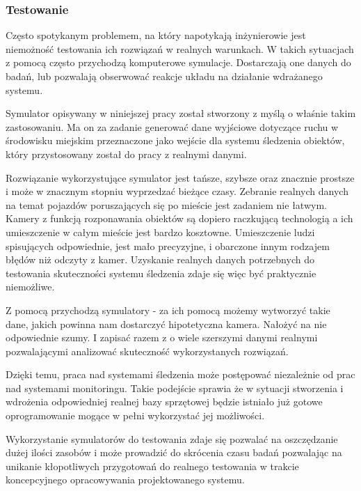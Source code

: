 \subsubsection{Testowanie}
\par{
Często spotykanym problemem, na który napotykają inżynierowie jest niemożność testowania ich rozwiązań w realnych warunkach. W takich sytuacjach z pomocą często przychodzą komputerowe symulacje. Dostarczają one danych do badań, lub pozwalają obserwować reakcje układu na działanie wdrażanego systemu.
}
\par{
Symulator opisywany w niniejszej pracy został stworzony z myślą o właśnie takim zastosowaniu. Ma on za zadanie generować dane wyjściowe dotyczące ruchu w środowisku miejskim przeznaczone jako wejście dla systemu śledzenia obiektów, który przystosowany został do pracy z realnymi danymi.
}
\par{
Rozwiązanie wykorzystujące symulator jest tańsze, szybsze oraz znacznie prostsze i może w znacznym stopniu wyprzedzać bieżące czasy.
Zebranie realnych danych na temat pojazdów poruszających się po mieście jest zadaniem nie łatwym. Kamery z funkcją rozponawania obiektów są dopiero raczkującą technologią a ich umieszczenie w całym mieście jest bardzo kosztowne. Umieszczenie ludzi spisujących odpowiednie, jest mało precyzyjne, i obarczone innym rodzajem błędów niż odczyty z kamer. Uzyskanie realnych danych potrzebnych do testowania skuteczności systemu śledzenia zdaje się więc być praktycznie niemożliwe.
}
\par{
Z pomocą przychodzą symulatory - za ich pomocą możemy wytworzyć takie dane, jakich powinna nam dostarczyć hipotetyczna kamera. Nałożyć na nie odpowiednie szumy. I zapisać razem z o wiele szerszymi danymi realnymi pozwalającymi analizować skuteczność wykorzystanych rozwiązań.
}
\par{
Dzięki temu, praca nad systemami śledzenia może postępować niezależnie od prac nad systemami monitoringu. Takie podejście sprawia że w sytuacji stworzenia i wdrożenia odpowiedniej realnej bazy sprzętowej będzie istniało już gotowe oprogramowanie mogące w pełni wykorzystać jej możliwości.
}
\par{
Wykorzystanie symulatorów do testowania zdaje się pozwalać na oszczędzanie dużej ilości zasobów i może prowadzić do skrócenia czasu badań pozwalając na unikanie kłopotliwych przygotowań do realnego testowania w trakcie koncepcyjnego opracowywania projektowanego systemu.
}

